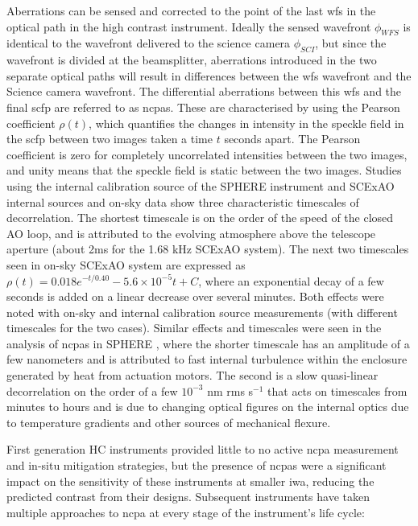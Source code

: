 \documentclass[letterpaper]{ar-1col}
\begin{document}
Aberrations can be sensed and corrected to the point of the last \ac{wfs} in the optical path in the high contrast instrument.
%
Ideally the sensed wavefront $\phi_{WFS}$ is identical to the wavefront delivered to the science camera $\phi_{SCI}$, but since the wavefront is divided at the beamsplitter, aberrations introduced in the two separate optical paths will result in differences between the \ac{wfs} wavefront and the Science camera wavefront.
%
The differential aberrations between this \ac{wfs} and the final \ac{scfp} are referred to as \acp{ncpa}.
%
These are characterised by using the Pearson coefficient $\rho(t)$, which quantifies the changes in intensity in the speckle field in the \ac{scfp} between two images taken a time $t$ seconds apart.
%
The Pearson coefficient is zero for completely uncorrelated intensities between the two images, and unity means that the speckle field is static between the two images.
%
Studies using the internal calibration source of the SPHERE instrument \citep{Martinez12,Milli18,Vigan22} and SCExAO internal sources and on-sky data \citep{Goebel18} show three characteristic timescales of decorrelation.
%
The shortest timescale is on the order of the speed of the closed AO loop, and is attributed to the evolving atmosphere above the telescope aperture (about 2ms for the 1.68 kHz SCExAO system).
%
The next two timescales seen in on-sky SCExAO system are expressed as $\rho(t)=0.018 e^{-t/0.40}-5.6\times 10^{-5}t + C$, where an exponential decay of a few seconds is added on a linear decrease over several minutes.
%
Both effects were noted with on-sky and internal calibration source measurements (with different timescales for the two cases).
%
Similar effects and timescales were seen in the analysis of \acp{ncpa} in SPHERE \citep{Vigan22}, where the shorter timescale has an amplitude of a few nanometers and is attributed to fast internal turbulence within the enclosure generated by heat from actuation motors.
%
The second is a slow quasi-linear decorrelation on the order of a few $10^{-3}$ nm rms s$^{-1}$ that acts on timescales from minutes to hours and is due to changing optical figures on the internal optics due to temperature gradients and other sources of mechanical flexure.

First generation HC instruments provided little to no active \ac{ncpa} measurement and in-situ mitigation strategies, but the presence of \acp{ncpa} were a significant impact on the sensitivity of these instruments at smaller \ac{iwa}, reducing the predicted contrast from their designs.
%
Subsequent instruments have taken multiple approaches to \ac{ncpa} at every stage of the instrument's life cycle:
\end{document}
